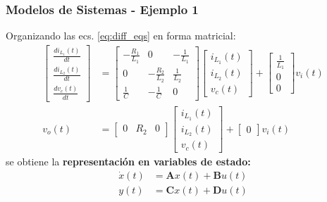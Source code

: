 \documentclass[aspectratio=169,handout]{beamer}
\theoremstyle{definition}
\theoremstyle{plain}
\theoremstyle{remark}
\begin{document}
\begin{frame}[<+->]\frametitle{Modelos de Sistemas - Ejemplo 1}
Organizando las ecs. \eqref{eq:diff_eqs} en forma matricial:
\begin{subequations}
\begin{align}
  \begin{bmatrix}
   \frac{di_{L_1}(t)}{dt} \\ \frac{di_{L_2}(t)}{dt} \\ \frac{dv_c(t)}{dt} 
  \end{bmatrix} &= 
  \begin{bmatrix}
  -\frac{R_1}{L_1} & 0 & -\frac{1}{L_1} \\
  0 & -\frac{R_2}{L_2} &  \frac{1}{L_2} \\
  \frac{1}{C} & -\frac{1}{C} & 0
  \end{bmatrix}
  \begin{bmatrix}
   i_{L_1}(t) \\ i_{L_2}(t) \\ v_c(t) 
  \end{bmatrix} + 
  \begin{bmatrix}
    \frac{1}{L_1} \\ 0 \\ 0
  \end{bmatrix} v_i(t)\\
  v_o(t) &=
  \begin{bmatrix}
    0 & R_2 & 0
  \end{bmatrix}
  \begin{bmatrix}
   i_{L_1}(t) \\ i_{L_2}(t) \\ v_c(t) 
  \end{bmatrix} + 
  \begin{bmatrix}
    0
  \end{bmatrix} v_i(t)
\end{align}
\end{subequations}
se obtiene la \textbf{representación en variables de estado:}
\begin{subequations}
  \begin{align}
    \dot{x}(t) &= \mathbf{A} x(t) + \mathbf{B}u(t)\\
    y(t) &= \mathbf{C}x(t) + \mathbf{D}u(t)
  \end{align}
\end{subequations}
\end{frame}
\end{document}

